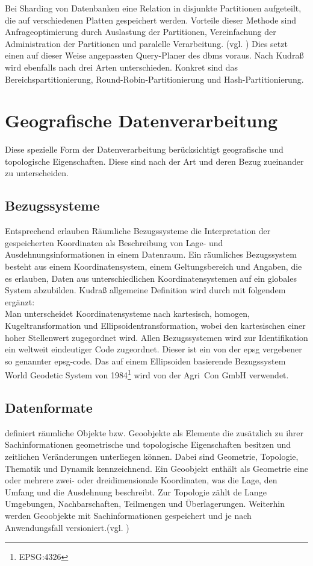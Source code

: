 Bei Sharding von Datenbanken eine Relation in disjunkte Partitionen aufgeteilt, die auf verschiedenen Platten gespeichert werden.
Vorteile dieser Methode sind Anfrageoptimierung durch Auslastung der Partitionen, Vereinfachung der Administration der Partitionen und paralelle Verarbeitung. (vgl. \cite[S.296]{book:kudrass})
Dies setzt einen auf dieser Weise angepassten Query-Planer des \Gls{dbms} voraus.
Nach Kudraß wird ebenfalls nach drei Arten unterschieden.
Konkret sind das Bereichspartitionierung, Round-Robin-Partitionierung und Hash-Partitionierung.

\section{Geografische Datenverarbeitung}

Diese spezielle Form der Datenverarbeitung berücksichtigt geografische und topologische Eigenschaften.
Diese sind nach der Art und deren Bezug zueinander zu unterscheiden.

\subsection{Bezugssysteme}
Entsprechend \cite[S.506]{book:kudrass} erlauben Räumliche Bezugssysteme die Interpretation der gespeicherten Koordinaten als Beschreibung von Lage- und Ausdehnungsinformationen in einem Datenraum. Ein räumliches Bezugssystem besteht aus einem Koordinatensystem, einem Geltungsbereich und Angaben, die es erlauben, Daten aus unterschiedlichen Koordinatensystemen auf ein globales System abzubilden.
Kudraß allgemeine Definition wird durch \cite[S.141 ff.]{book:gi-theopluspraxis3} mit folgendem ergänzt:\\
Man unterscheidet Koordinatensysteme nach kartesisch, homogen, Kugeltransformation und Ellipsoidentransformation, wobei den kartesischen einer hoher Stellenwert zugegordnet wird.
Allen Bezugssystemen wird zur Identifikation ein weltweit eindeutiger Code zugeordnet.
Dieser ist ein von der \Gls{epsg} vergebener so genannter \Gls{epsg-code}.
Das auf einem Ellipsoiden basierende Bezugssystem World Geodetic System von 1984\footnote{EPSG:4326} wird von der Agri~Con GmbH verwendet.


\subsection{Datenformate}
\cite[S.133]{book:gi-theopluspraxis3} definiert räumliche Objekte bzw. Geoobjekte als Elemente die zusätzlich zu ihrer Sachinformationen geometrische und topologische Eigenschaften besitzen und zeitlichen Veränderungen unterliegen können. Dabei sind Geometrie, Topologie, Thematik und Dynamik kennzeichnend.
Ein Geoobjekt enthält als Geometrie eine oder mehrere zwei- oder dreidimensionale Koordinaten, was die Lage, den Umfang und die Ausdehnung beschreibt.
Zur Topologie zählt de Lange Umgebungen, Nachbarschaften, Teilmengen und Überlagerungen.
Weiterhin werden Geoobjekte mit Sachinformationen gespeichert und je nach Anwendungsfall versioniert.(vgl. \cite[S.133]{book:gi-theopluspraxis3})


